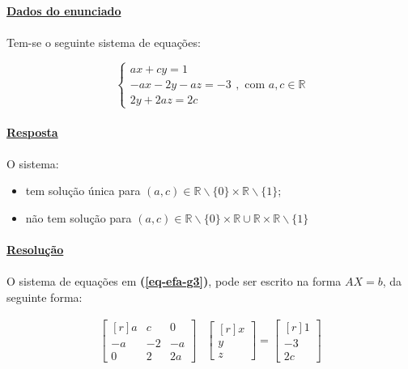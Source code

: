 \grupo{}

\paragraph{\underline{Dados do enunciado}}

\paragraph{} Tem-se o seguinte sistema de equações:

\begin{equation}\label{eq-efa-g3}
	\begin{cases}
		ax + cy = 1\\
		-ax - 2y -az = -3\\
		2y + 2az = 2c
	\end{cases},
	\text{ com } a, c \in \mathbb{R}
\end{equation}

\paragraph{\underline{Resposta}}

\paragraph{}O sistema:

\begin{itemize}
	\item tem solução única para
		$(a, c) \in \mathbb{R}\backslash\{0\} \times
		\mathbb{R}\backslash\{1\}$;
	\item não tem solução para $(a, c) \in \mathbb{R}\backslash\{0\} \times \mathbb{R}
		\cup \mathbb{R} \times \mathbb{R}\backslash\{1\}$
\end{itemize}

\paragraph{\underline{Resolução}}

\paragraph{}O sistema de equações em \textbf{(\ref{eq-efa-g3})}, pode ser escrito na
forma $AX = b$, da seguinte forma:

\begin{align*}
	\begin{bmatrix*}[r]
		a  & c  & 0\\
		-a & -2 & -a\\
		0  & 2  & 2a
	\end{bmatrix*}&
	\begin{bmatrix*}[r]
		x\\
		y\\
		z
	\end{bmatrix*}
	=
	\begin{bmatrix*}[r]
		1\\
		-3\\
		2c
	\end{bmatrix*}
\end{align*}


